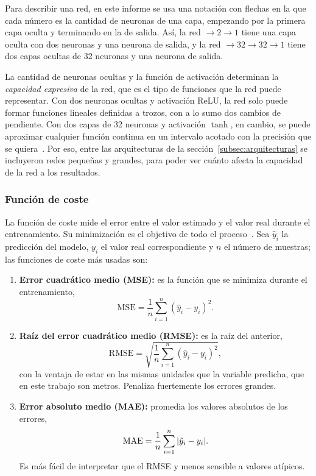 \documentclass[titlepage,11pt]{article}
\begin{document}
Para describir una red, en este informe se usa una notación con flechas en la
que cada número es la cantidad de neuronas de una capa, empezando por la
primera capa oculta y terminando en la de salida. Así, la red $\to2\to1$ tiene
una capa oculta con dos neuronas y una neurona de salida, y la red
$\to32\to32\to1$ tiene dos capas ocultas de 32 neuronas y una neurona de
salida.

La cantidad de neuronas ocultas y la función de activación determinan la
\emph{capacidad expresiva} de la red, que es el tipo de funciones que la red
puede representar. Con dos neuronas ocultas y activación ReLU, la red solo
puede formar funciones lineales definidas a trozos, con a lo sumo dos cambios
de pendiente. Con dos capas de 32 neuronas y activación $\tanh$, en cambio, se
puede aproximar cualquier función continua en un intervalo acotado con la
precisión que se quiera~\cite{goodfellow_2016_deep}. Por eso, entre las
arquitecturas de la sección~\ref{subsec:arquitecturas} se incluyeron redes
pequeñas y grandes, para poder ver cuánto afecta la capacidad de la red a los
resultados.

\subsubsection{Función de coste}
\label{subsubsec:coste}
La función de coste mide el error entre el valor estimado y el valor real
durante el entrenamiento. Su minimización es el objetivo de todo el
proceso~\cite{antonio_2023_introduccin,ibm_qu}. Sea $\hat y_i$ la
predicción del modelo, $y_i$ el valor real correspondiente y $n$ el número de
muestras; las funciones de coste más usadas son:

\begin{enumerate}
\item \textbf{Error cuadrático medio (MSE):} es la función que se minimiza
  durante el entrenamiento,
  \begin{equation}
    \mathrm{MSE}=\frac{1}{n}\sum_{i=1}^{n}(\hat y_i-y_i)^2.
  \end{equation}

\item \textbf{Raíz del error cuadrático medio (RMSE):} es la raíz del anterior,
  \begin{equation}
    \mathrm{RMSE}=\sqrt{\frac{1}{n}\sum_{i=1}^{n}(\hat y_i-y_i)^2},
  \end{equation}
  con la ventaja de estar en las mismas unidades que la variable predicha, que
  en este trabajo son metros. Penaliza fuertemente los errores grandes.

\item \textbf{Error absoluto medio (MAE):} promedia los valores absolutos de
  los errores,
  \begin{equation}
    \mathrm{MAE}=\frac{1}{n}\sum_{i=1}^{n}\abs{\hat y_i-y_i}.
  \end{equation}
  Es más fácil de interpretar que el RMSE y menos sensible a valores atípicos.
\end{enumerate}
\end{document}
